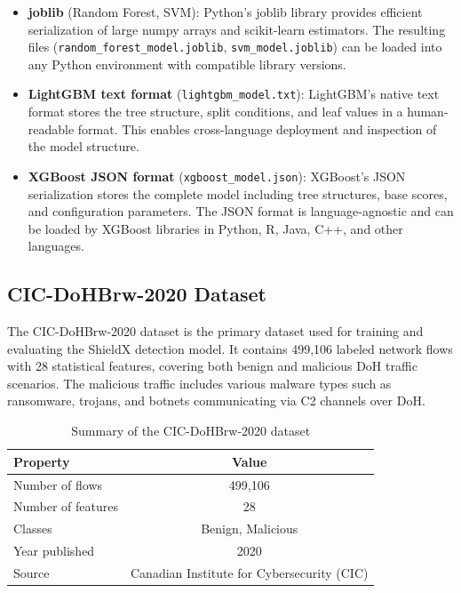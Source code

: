 \documentclass[../Main.tex]{subfiles}
\begin{document}
\begin{itemize}
    \item \textbf{joblib} (Random Forest, SVM): Python's joblib library provides efficient serialization of large numpy arrays and scikit-learn estimators. The resulting files (\texttt{random\_forest\_model.joblib}, \texttt{svm\_model.joblib}) can be loaded into any Python environment with compatible library versions.
    \item \textbf{LightGBM text format} (\texttt{lightgbm\_model.txt}): LightGBM's native text format stores the tree structure, split conditions, and leaf values in a human-readable format. This enables cross-language deployment and inspection of the model structure.
    \item \textbf{XGBoost JSON format} (\texttt{xgboost\_model.json}): XGBoost's JSON serialization stores the complete model including tree structures, base scores, and configuration parameters. The JSON format is language-agnostic and can be loaded by XGBoost libraries in Python, R, Java, C++, and other languages.
\end{itemize}

\subsection{CIC-DoHBrw-2020 Dataset}

The CIC-DoHBrw-2020 dataset \cite{montazeri2020doh} is the primary dataset used for training and evaluating the ShieldX detection model. It contains 499,106 labeled network flows with 28 statistical features, covering both benign and malicious DoH traffic scenarios. The malicious traffic includes various malware types such as ransomware, trojans, and botnets communicating via C2 channels over DoH.

\begin{table}[H]
\centering
\small
\begin{tabular}{|l|c|}
\hline
\textbf{Property} & \textbf{Value} \\
\hline
Number of flows & 499,106 \\
Number of features & 28 \\
Classes & Benign, Malicious \\
Year published & 2020 \\
Source & Canadian Institute for Cybersecurity (CIC) \\
\hline
\end{tabular}
\caption{Summary of the CIC-DoHBrw-2020 dataset}
\label{tab:dataset_summary}
\end{table}
\end{document}
